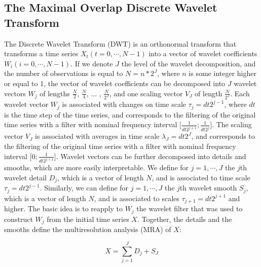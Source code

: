 \documentclass{article}
\begin{document}
\subsection{The Maximal Overlap Discrete Wavelet Transform}

The Discrete Wavelet Transform (DWT) is an orthonormal transform that transforms a time series $X_t \left( t = 0, \cdots , N - 1 \right)$ into a vector of wavelet coefficients $W_i \left( i = 0 , \cdots , N - 1 \right)$. If we denote $J$ the level of the wavelet decomposition, and the number of observations is equal to $N = n * 2^J$, where $n$ is some integer higher or equal to 1, the vector of wavelet coefficients can be decomposed into $J$ wavelet vectors $W_j$ of lengths $\frac{N}{2}$, $\frac{N}{4}$, ... , $\frac{N}{2^J}$, and one scaling vector $V_J$ of length $\frac{N}{2^J}$. Each wavelet vector $W_j$ is associated with changes on time scale $\tau_j = dt 2^{j - 1}$, where $dt$ is the time step of the time series, and corresponds to the filtering of the original time series with a filter with nominal frequency interval $\lbrack \frac{1}{dt 2^{j + 1}} ; \frac{1}{dt 2^j} \rbrack$. The scaling vector $V_J$ is associated with averages in time scale $\lambda_J = dt 2^J$, and corresponds to the filtering of the original time series with a filter with nominal frequency interval $\lbrack 0 ; \frac{1}{dt 2^{j + 1}} \rbrack$. Wavelet vectors can be further decomposed into details and smooths, which are more easily interpretable. We define for $j = 1 , \cdots , J$ the $j$th wavelet detail $D_j$, which is a vector of length $N$, and is associated to time scale $\tau_j = dt 2^{j - 1}$. Similarly, we can define for $j = 1 , \cdots , J$ the $j$th wavelet smooth $S_j$, which is a vector of length $N$, and is associated to scales $\tau_{j + 1} = dt 2^{j + 1}$ and higher. The basic idea is to reapply to $W_j$ the wavelet filter that was used to construct $W_j$ from the initial time series $X$. Together, the details and the smooths define the multiresolution analysis (MRA) of $X$:

\begin{linenomath*}
\begin{equation}
X = \sum_{j = 1}^{J} D_j + S_J
\end{equation}
\end{linenomath*}
\end{document}
